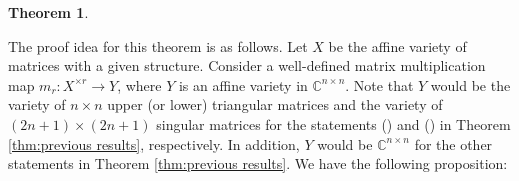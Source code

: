 \documentclass[reqno]{amsart}
\newtheorem{theorem}{Theorem}[section]
\theoremstyle{definition}
\numberwithin{equation}{section}
\begin{document}
\begin{theorem}

\end{theorem}

The proof idea for this theorem is as follows. Let $X$ be the affine variety of matrices with a given structure. Consider a well-defined matrix multiplication map $m_r:X^{\times r} \rightarrow Y$, where $Y$ is an affine variety in $\mathbb{C}^{n \times n}$. Note that $Y$ would be the variety of $n \times n$ upper (or lower) triangular matrices and the variety of $(2n+1) \times (2n+1)$ singular matrices for the statements () and () in Theorem \ref{thm:previous results}, respectively. In addition, $Y$ would be $\mathbb{C}^{n \times n}$ for the other statements in Theorem \ref{thm:previous results}. We have the following proposition:
\end{document}
